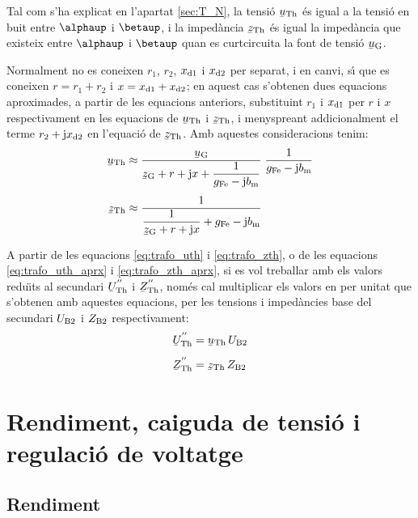 Tal com s'ha explicat en l'apartat \vref{sec:T_N}, la tensi\'{o}
$\cmplx{u}\ped{Th}$ \'{e}s igual a la tensi\'{o} en buit entre $\alphaup$ i
$\betaup$, i la imped\`{a}ncia $\cmplx{z}\ped{Th}$ \'{e}s igual la imped\`{a}ncia
que existeix entre $\alphaup$ i $\betaup$ quan es curtcircuita la font
de tensi\'{o} $\cmplx{u}\ped{G}$.

Normalment no es coneixen $r_1$, $r_2$, $x_\mathrm{d1}$ i $x_\mathrm{d2}$ per separat, i
en canvi, s\'{\i} que es coneixen $r=r_1+r_2$ i $x=x_\mathrm{d1}+x_\mathrm{d2}$; en aquest
cas s'obtenen dues equacions aproximades, a partir de les equacions
anteriors, substituint $r_1$ i $x_\mathrm{d1}$ per $r$ i $x$ respectivament en
les equacions de $\cmplx{u}\ped{Th}$ i $\cmplx{z}\ped{Th}$, i
menyspreant addicionalment el terme $r_2 + \mathrm{j} x_\mathrm{d2}$ en l'equaci\'{o}
de $\cmplx{z}\ped{Th}$. Amb aquestes consideracions tenim:
\begin{align}
    \cmplx{u}\ped{Th} &\approx \frac{\cmplx{u}\ped{G}}{\cmplx{z}\ped{G} + r + \ju
    x + \dfrac{1}{g\ped{Fe}-\ju b\ped{m}}} \;\frac{1}{g\ped{Fe}-\ju
    b\ped{m}} \label{eq:trafo_uth_aprx}\\[1ex]
    \cmplx{z}\ped{Th} &\approx \frac{1}{\dfrac{1}{\cmplx{z}\ped{G} + r +
    \ju x} + g\ped{Fe}-\ju b\ped{m}}\label{eq:trafo_zth_aprx}
\end{align}

A partir de les equacions \eqref{eq:trafo_uth} i
\eqref{eq:trafo_zth}, o de les equacions \eqref{eq:trafo_uth_aprx} i
\eqref{eq:trafo_zth_aprx}, si es vol treballar amb els valors
redu\"{\i}ts al secundari $\cmplx{U}\ped{Th}^{''}$ i
$\cmplx{Z}\ped{Th}^{''}$, nom\'{e}s cal multiplicar els valors en per unitat
que s'obtenen amb aquestes equacions, per les tensions i imped\`{a}ncies
base del secundari $U_\mathrm{B2}$ i $Z_\mathrm{B2}$ respectivament:
\begin{align}
    \cmplx{U}\ped{Th}^{''} &= \cmplx{u}\ped{Th} \, U\ped{B2} \\[1ex]
    \cmplx{Z}\ped{Th}^{''} &= \cmplx{z}\ped{Th} \, Z\ped{B2}
\end{align}


\section{Rendiment, caiguda de tensi\'{o} i regulaci\'{o} de voltatge}

\subsection{Rendiment}

